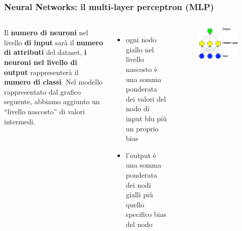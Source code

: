 \begin{frame}

	\frametitle{Neural Networks: il multi-layer perceptron (MLP)}

	\begin{columns}
		Il \textbf{numero di neuroni} nel livello \textbf{di input} sarà il \textbf{numero di attributi} del dataset, \textbf{i neuroni nel livello di output} rappresenterà il \textbf{numero di classi}.
		\newlinedouble
		Nel modello rappresentato dal grafico seguente, abbiamo aggiunto un ``livello nascosto'' di valori intermedi.
		\begin{itemize}
			\item ogni nodo giallo nel livello nascosto è una somma ponderata dei valori del nodo di input blu più un proprio bias
			\item l'output è una somma ponderata dei nodi gialli più quello specifico bias del nodo
		\end{itemize}

		\begin{figure}[!htbp]
			\centering
			\includegraphics[width=1.0\linewidth]{images/supervised/z_algorithms_neural_networks/1hidden.png}
		\end{figure}
	\end{columns}

\end{frame}


